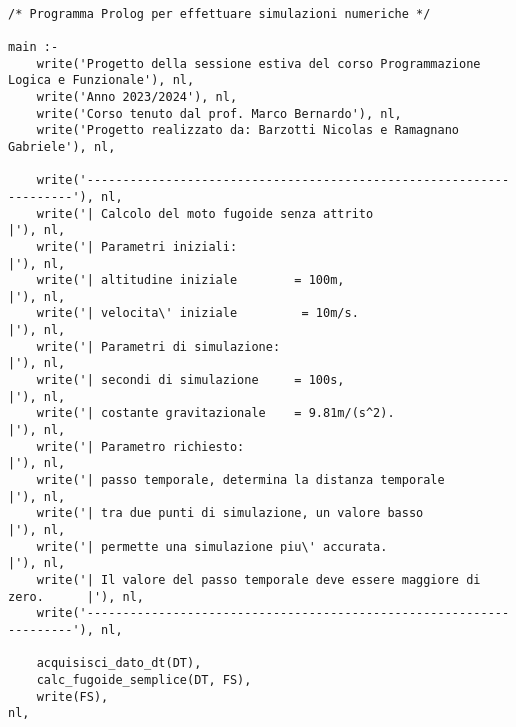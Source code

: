 \scriptsize
\begin{verbatim}
   
/* Programma Prolog per effettuare simulazioni numeriche */

main :-
    write('Progetto della sessione estiva del corso Programmazione Logica e Funzionale'), nl,
    write('Anno 2023/2024'), nl,
    write('Corso tenuto dal prof. Marco Bernardo'), nl,
    write('Progetto realizzato da: Barzotti Nicolas e Ramagnano Gabriele'), nl,

    write('--------------------------------------------------------------------'), nl,
    write('| Calcolo del moto fugoide senza attrito                           |'), nl,
    write('| Parametri iniziali:                                              |'), nl,
    write('| altitudine iniziale        = 100m,                               |'), nl,
    write('| velocita\' iniziale         = 10m/s.                              |'), nl,
    write('| Parametri di simulazione:                                        |'), nl,
    write('| secondi di simulazione     = 100s,                               |'), nl,
    write('| costante gravitazionale    = 9.81m/(s^2).                        |'), nl,
    write('| Parametro richiesto:                                             |'), nl,
    write('| passo temporale, determina la distanza temporale                 |'), nl,
    write('| tra due punti di simulazione, un valore basso                    |'), nl,
    write('| permette una simulazione piu\' accurata.                          |'), nl,
    write('| Il valore del passo temporale deve essere maggiore di zero.      |'), nl,
    write('--------------------------------------------------------------------'), nl,

    acquisisci_dato_dt(DT),                                                        
    calc_fugoide_semplice(DT, FS),
    write(FS),                                                                     nl,


\end{verbatim}
